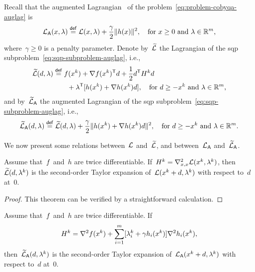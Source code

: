 Recall that the augmented Lagrangian~\cite{Hestenes_1969,Powell_1969,Rockafellar_1973,Rockafellar_2022} of the problem~\cref{eq:problem-cobyqa-auglag} is
\begin{equation}
    \label{eq:augmented-lagrangian-inequality}
    \auglag(\iter, \lm) \eqdef \lag(\iter, \lm) + \frac{\gamma}{2} \norm{h(\iter)}^2, \quad \text{for~$\iter \ge 0$ and~$\lm \in \R^m$,}
\end{equation}
%
where~$\gamma \ge 0$ is a penalty parameter.
Denote by~$\lagalt$ the Lagrangian of the \gls{sqp} subproblem~\cref{eq:sqp-subproblem-auglag}, i.e.,
\begin{align*}
    \lagalt(\step, \lm) & \eqdef \obj(\iter[k]) + \nabla \obj(\iter[k])^{\T} \step + \frac{1}{2} \step^{\T} H^k \step\\
                        & \qquad + \lm^{\T} [h(\iter[k]) + \nabla h(\iter[k]) \step], \quad \text{for~$\step \ge -\iter[k]$ and~$\lm \in \R^m$,}
\end{align*}
and by~$\widetilde{\mathcal{L}}_{\mathsf{A}}$ the augmented Lagrangian of the \gls{sqp} subproblem~\cref{eq:sqp-subproblem-auglag}, i.e.,
\begin{equation*}
    \auglagalt(\step, \lm) \eqdef \lagalt(\step, \lm) + \frac{\gamma}{2} \norm{h(\iter[k]) + \nabla h(\iter[k]) \step}^2, \quad \text{for~$\step \ge -\iter[k]$ and~$\lm \in \R^m$.}
\end{equation*}

We now present some relations between~$\lag$ and~$\lagalt$, and between~$\mathcal{L}_{\mathsf{A}}$ and~$\widetilde{\mathcal{L}}_{\mathsf{A}}$.

\begin{theorem}
    \label{thm:auglag-sqp-1}
    Assume that~$f$ and~$h$ are twice differentiable.
    If~$H^k = \nabla_{x, x}^2 \lag(\iter[k], \lm[k])$, then~$\lagalt(\step, \lm[k])$ is the second-order Taylor expansion of~$\lag(\iter[k] + \step, \lm[k])$ with respect to~$d$ at~$0$.
\end{theorem}

\begin{proof}
    This theorem can be verified by a straightforward calculation.
\end{proof}

\begin{theorem}
    \label{thm:auglag-sqp-2}
    Assume that~$f$ and~$h$ are twice differentiable.
    If
    \begin{equation}
        \label{eq:auglag-sqp-2}
        H^k = \nabla^2 \obj(\iter[k]) + \sum_{i = 1}^m [\lm[k]_i + \gamma h_i(\iter[k])] \nabla^2 h_i(\iter[k]),
    \end{equation}
    then~$\auglagalt(\step, \lm[k])$ is the second-order Taylor expansion of~$\auglag(\iter[k] + d, \lm[k])$ with respect to~$d$ at~$0$.
\end{theorem}

